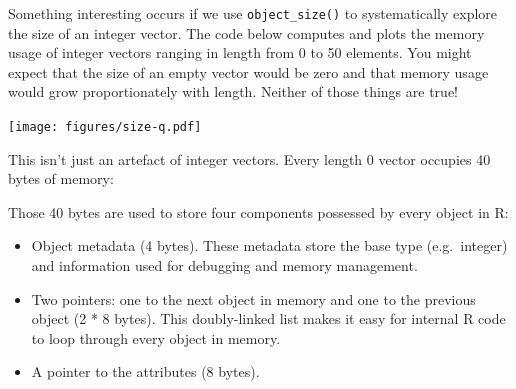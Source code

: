 Something interesting occurs if we use \texttt{object\_size()} to
systematically explore the size of an integer vector. The code below
computes and plots the memory usage of integer vectors ranging in length
from 0 to 50 elements. You might expect that the size of an empty vector
would be zero and that memory usage would grow proportionately with
length. Neither of those things are true! 

\begin{Shaded}
\begin{Highlighting}[]
\StringTok{ }\NormalTok{(}\NormalTok{:}\NormalTok{(}
\NormalTok{(}\NormalTok{:} \NormalTok{, } \NormalTok{, }
   \NormalTok{)}
\end{Highlighting}
\end{Shaded}

\texttt{[image: figures/size-q.pdf]}

This isn't just an artefact of integer vectors. Every length 0 vector
occupies 40 bytes of memory:

\begin{Shaded}
\begin{Highlighting}[]
\NormalTok{(}\NormalTok{())}
\NormalTok{(}\NormalTok{())}
\NormalTok{(}\NormalTok{())}
\NormalTok{(}\NormalTok{())}
\end{Highlighting}
\end{Shaded}

Those 40 bytes are used to store four components possessed by every
object in R:

\begin{itemize}
\item
  Object metadata (4 bytes). These metadata store the base type
  (e.g.~integer) and information used for debugging and memory
  management.
\item
  Two pointers: one to the next object in memory and one to the previous
  object (2 * 8 bytes). This doubly-linked list makes it easy for
  internal R code to loop through every object in memory.
\item
  A pointer to the attributes (8 bytes).
\end{itemize}

